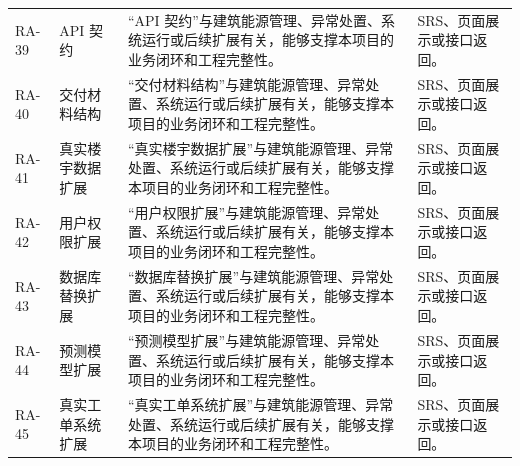 \documentclass[12pt,a4paper]{ctexart}
\begin{document}
\begin{longtable}{L{1.7cm}L{4.4cm}L{6.0cm}L{3.4cm}}
RA-39 & API 契约 & “API 契约”与建筑能源管理、异常处置、系统运行或后续扩展有关，能够支撑本项目的业务闭环和工程完整性。 & SRS、页面展示或接口返回。 \\
RA-40 & 交付材料结构 & “交付材料结构”与建筑能源管理、异常处置、系统运行或后续扩展有关，能够支撑本项目的业务闭环和工程完整性。 & SRS、页面展示或接口返回。 \\
RA-41 & 真实楼宇数据扩展 & “真实楼宇数据扩展”与建筑能源管理、异常处置、系统运行或后续扩展有关，能够支撑本项目的业务闭环和工程完整性。 & SRS、页面展示或接口返回。 \\
RA-42 & 用户权限扩展 & “用户权限扩展”与建筑能源管理、异常处置、系统运行或后续扩展有关，能够支撑本项目的业务闭环和工程完整性。 & SRS、页面展示或接口返回。 \\
RA-43 & 数据库替换扩展 & “数据库替换扩展”与建筑能源管理、异常处置、系统运行或后续扩展有关，能够支撑本项目的业务闭环和工程完整性。 & SRS、页面展示或接口返回。 \\
RA-44 & 预测模型扩展 & “预测模型扩展”与建筑能源管理、异常处置、系统运行或后续扩展有关，能够支撑本项目的业务闭环和工程完整性。 & SRS、页面展示或接口返回。 \\
RA-45 & 真实工单系统扩展 & “真实工单系统扩展”与建筑能源管理、异常处置、系统运行或后续扩展有关，能够支撑本项目的业务闭环和工程完整性。 & SRS、页面展示或接口返回。 \\
\bottomrule
\end{longtable}
\end{document}
